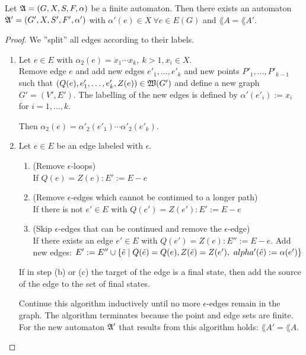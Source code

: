\begin{lemma}
Let $\mbox{$\mathfrak{A}$} = (G, X, S, F, \alpha)$ be a finite automaton. Then there
exists an automaton $\mbox{$\mathfrak{A'}$} = (G', X, S', F', \alpha')$ with $\alpha'(e)
\in X\ \forall e \in E(G)$ and $\lang{A} = \lang{A'}$.
\end{lemma}

\begin{proof}
We ''split'' all edges according to their labels.

\begin{enumerate}
  \item Let $e \in E$ with $\alpha_2(e) = x_1 \cdots x_k,\ k > 1, x_i \in X$.\\
  Remove edge $e$ and add new edges $e'_1,
  \ldots, e'_k$ and new points $P'_1, \ldots, P'_{k-1}$ such that $(Q(e),
  e'_1, \ldots, e'_k, Z(e)) \in \mbox{$\mathfrak{W}({G'})$}$ and define a new graph $G' =
  (V', E')$. The labelling of the new edges is defined by $\alpha'(e'_i) := x_i$
  for $i = 1, \ldots, k$.
  
  Then $\alpha_2(e) = \alpha'_2(e'_1) \cdots \alpha'_2(e'_k)$.
  
  \item Let $e \in E$ be an edge labeled with $\epsilon$.
  \begin{enumerate}
    \item  (Remove $\epsilon$-loops) \\
    If $Q(e) = Z(e) : E' := E - e$
    \item (Remove
    $\epsilon$-edges which cannot be continued to a longer path)\\
    If there is
    not $e' \in E$ with $Q(e') = Z(e') : E' := E - e$
    \item  (Skip $\epsilon$-edges that can be continued and remove the
    $\epsilon$-edge)\\
    If there exists an edge $e' \in E$ with $Q(e') = Z(e) : E'' := E - e$.
    Add new edges: $E' := E'' \cup \mbox{$\{\tilde{e} \mid Q(\tilde{e}) = Q(e), 
    Z(\tilde{e}) = Z(e'),\ alpha'(\tilde{e}) := \alpha(e')\}$}$
  \end{enumerate}
  If in step (b) or (c) the target of the edge is a final state, then add the
  source of the edge to the set of final states.
  
  Continue this algorithm inductively until no more $\epsilon$-edges remain in
  the graph. The algorithm terminates because the point and edge sets are
  finite. For the new automaton $\mbox{$\mathfrak{A'}$}$ that results from this algorithm
  holds: $\lang{A'} = \lang{A}$.
\end{enumerate}
\end{proof}

